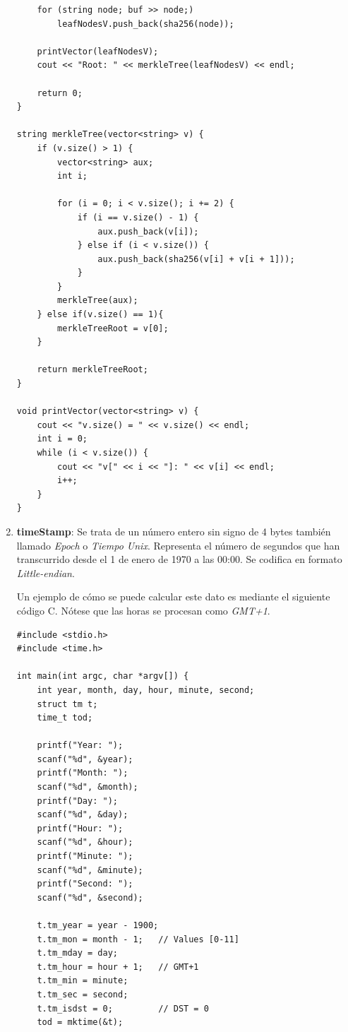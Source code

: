 \documentclass{article}
\begin{document}
\begin{enumerate}
\begin{verbatim}
    for (string node; buf >> node;)
        leafNodesV.push_back(sha256(node));
        
    printVector(leafNodesV);
    cout << "Root: " << merkleTree(leafNodesV) << endl;
    
    return 0;
}

string merkleTree(vector<string> v) {
    if (v.size() > 1) {
        vector<string> aux;
        int i;
        
        for (i = 0; i < v.size(); i += 2) {
            if (i == v.size() - 1) {
                aux.push_back(v[i]);
            } else if (i < v.size()) {
                aux.push_back(sha256(v[i] + v[i + 1]));
            }
        }
        merkleTree(aux);
    } else if(v.size() == 1){
        merkleTreeRoot = v[0];
    }
    
    return merkleTreeRoot;
}

void printVector(vector<string> v) {
    cout << "v.size() = " << v.size() << endl;
    int i = 0;
    while (i < v.size()) {
        cout << "v[" << i << "]: " << v[i] << endl;
        i++;
    }
}
        \end{verbatim}
        
        \item \textbf{timeStamp}: Se trata de un número entero sin signo de 4 bytes también llamado \textit{Epoch} o \textit{Tiempo Unix}. Representa el número de segundos que han transcurrido desde el 1 de enero de 1970 a las 00:00. Se codifica en formato \textit{Little-endian}.
        
        Un ejemplo de cómo se puede calcular este dato es mediante el siguiente código C. Nótese que las horas se procesan como \textit{GMT+1}.
        
        \begin{verbatim}
#include <stdio.h>
#include <time.h>

int main(int argc, char *argv[]) {
    int year, month, day, hour, minute, second;
    struct tm t;
    time_t tod;
    
    printf("Year: ");
    scanf("%d", &year);
    printf("Month: ");
    scanf("%d", &month);
    printf("Day: ");
    scanf("%d", &day);
    printf("Hour: ");
    scanf("%d", &hour);
    printf("Minute: ");
    scanf("%d", &minute);
    printf("Second: ");
    scanf("%d", &second);
    
    t.tm_year = year - 1900;
    t.tm_mon = month - 1;   // Values [0-11]
    t.tm_mday = day;
    t.tm_hour = hour + 1;   // GMT+1
    t.tm_min = minute;
    t.tm_sec = second;
    t.tm_isdst = 0;         // DST = 0
    tod = mktime(&t);
    

\end{verbatim}
\end{enumerate}
\end{document}
